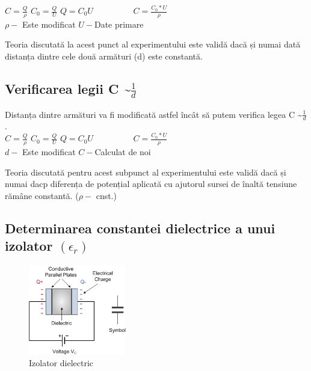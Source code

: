 \documentclass[12pt]{article}
\begin{document}
$C=\frac{Q}{\rho}$ \hspace{2cm} $C_{0}=\frac{Q}{U}$ \hspace{2cm}  $Q=C_{0}U \hspace{2cm}  C=\frac{C_{0}*U}{\rho}$\\

$\rho- $ Este modificat \hspace{2cm} $U- $Date primare\\

\begin{tcolorbox}[colback=yellow!10!white, colframe=black, title=Observație]
Teoria discutată la acest punct al experimentului este validă dacă și numai dată distanța dintre cele două armături (d) este constantă.
\end{tcolorbox}

\subsection{Verificarea legii C \textasciitilde $\frac{1}{d}$}
Distanța dintre armături va fi modificată astfel încât să putem verifica legea C \textasciitilde $\frac{1}{d}$.\\

$C=\frac{Q}{\rho}$ \hspace{2cm} $C_{0}=\frac{Q}{U}$ \hspace{2cm}  $Q=C_{0}U \hspace{2cm}  C=\frac{C_{0}*U}{\rho}$\\

$d- $ Este modificat \hspace{2cm} $C- $Calculat de noi\\

\begin{tcolorbox}[colback=yellow!10!white, colframe=black, title=Observație]
Teoria discutată pentru acest subpunct al experimentului este validă dacă și numai dacp diferența de potențial aplicată cu ajutorul
sursei de înaltă tensiune rămâne constantă. ($\rho- $ cnst.)
\end{tcolorbox}

\subsection{ Determinarea constantei dielectrice a unui izolator \textbf{$(\epsilon_{r})$}}

\begin{figure} 
    \centering
    \includegraphics[width=0.38\textwidth]{dielectric.png} 
    \caption{Izolator dielectric}
    \label{fig:Dielectric}
\end{figure}
\end{document}
